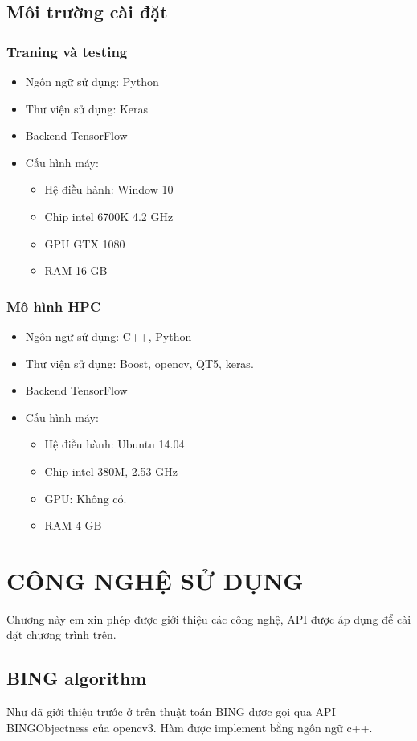 \documentclass[13pt, a4paper]{extreport}
\begin{document}
\section{Môi trường cài đặt}
\subsection{Traning và testing}
\begin{itemize}
\item Ngôn ngữ sử dụng: Python
\item Thư viện sử dụng: Keras
\item Backend TensorFlow
\item Cấu hình máy:
  \begin{itemize}
  	\item Hệ điều hành: Window 10
  	\item Chip intel 6700K 4.2 GHz
  	\item GPU  GTX 1080
  	\item RAM 16 GB
  \end{itemize}
\end{itemize}
\subsection{Mô hình HPC}
\begin{itemize}
\item Ngôn ngữ sử dụng: C++, Python
\item Thư viện sử dụng: Boost, opencv, QT5, keras.
\item Backend TensorFlow
\item Cấu hình máy:
  \begin{itemize}
  	\item Hệ điều hành: Ubuntu 14.04
  	\item Chip intel 380M, 2.53 GHz
  	\item GPU: Không có.
  	\item RAM 4 GB
  \end{itemize}
\end{itemize}
\chapter{CÔNG NGHỆ SỬ DỤNG}
\indent Chương này em xin phép được giới thiệu các công nghệ, API được áp dụng để cài đặt chương trình trên.
\section{BING algorithm}
\indent Như đã giới thiệu trước ở trên thuật toán BING đươc gọi qua API BINGObjectness của opencv3. Hàm được implement bằng ngôn ngữ c++.
\end{document}
